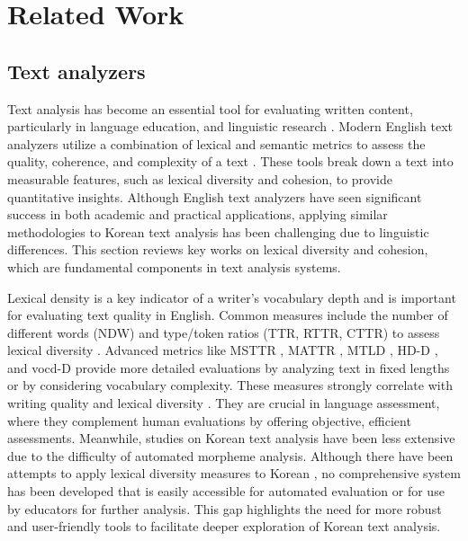\section{Related Work}
\label{sec:02_relatedworks}

\subsection{Text analyzers} 

Text analysis has become an essential tool for evaluating written content, particularly in language education, and linguistic research \cite{mcnamara2010linguistic, ha2019lexical}. Modern English text analyzers utilize a combination of lexical and semantic metrics to assess the quality, coherence, and complexity of a text \cite{crossley2016tool}. These tools break down a text into measurable features, such as lexical diversity and cohesion, to provide quantitative insights. Although English text analyzers have seen significant success in both academic and practical applications, applying similar methodologies to Korean text analysis has been challenging due to linguistic differences. This section reviews key works on lexical diversity and cohesion, which are fundamental components in text analysis systems. 

Lexical density is a key indicator of a writer's vocabulary depth and is important for evaluating text quality in English. Common measures include the number of different words (NDW) \cite{miller1991contextual} and type/token ratios (TTR, RTTR, CTTR) \cite{chotlos1944iv, guiraud1959problemes, carroll1964language} to assess lexical diversity \cite{van2007comparing}. Advanced metrics like MSTTR \cite{johnson1944studies}, MATTR \cite{covington2007mattr}, MTLD \cite{mccarthy2005assessment}, HD-D \cite{mccarthy2010mtld}, and vocd-D \cite{mccarthy2007vocd} provide more detailed evaluations by analyzing text in fixed lengths or by considering vocabulary complexity. These measures strongly correlate with writing quality and lexical diversity \cite{ha2019lexical}. They are crucial in language assessment, where they complement human evaluations by offering objective, efficient assessments. Meanwhile, studies on Korean text analysis have been less extensive due to the difficulty of automated morpheme analysis. Although there have been attempts to apply lexical diversity measures to Korean \cite{lee2024exploring}, no comprehensive system has been developed that is easily accessible for automated evaluation or for use by educators for further analysis. This gap highlights the need for more robust and user-friendly tools to facilitate deeper exploration of Korean text analysis. 

